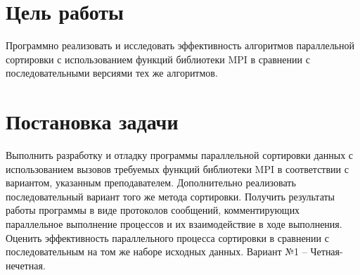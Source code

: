 \documentclass[a4paper,14pt]{extarticle}
\begin{document}


\section{Цель работы}
Программно реализовать и исследовать эффективность алгоритмов параллельной
сортировки с использованием функций библиотеки MPI в сравнении с
последовательными версиями тех же алгоритмов.

\section{Постановка задачи}
Выполнить разработку и отладку программы параллельной сортировки данных с
использованием вызовов требуемых функций библиотеки MPI в соответствии с
вариантом, указанным преподавателем. Дополнительно реализовать последовательный
вариант того же метода сортировки. Получить результаты работы программы в виде
протоколов сообщений, комментирующих параллельное выполнение процессов и их
взаимодействие в ходе выполнения. Оценить эффективность параллельного процесса
сортировки в сравнении с последовательным на том же наборе исходных данных.
Вариант №1 -- Четная-нечетная.
\end{document}
